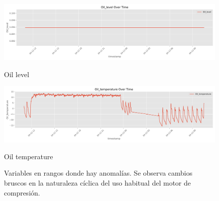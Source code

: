 \documentclass[12pt,letterpaper]{article}
\begin{document}
\begin{figure}[htp]
    \begin{minipage}[b]{0.45\textwidth}
        \centering
        \includegraphics[width=\textwidth]{Oil_level.png}
        \caption*{Oil level}
    \end{minipage}
    \hfill
    \begin{minipage}[b]{0.45\textwidth}
        \centering
        \includegraphics[width=\textwidth]{Oil_temperature.png}
        \caption*{Oil temperature}
    \end{minipage}
    \vspace{0.5em}
\caption{Variables en rangos donde hay anomalías. Se observa cambios bruscos en la naturaleza cíclica del uso habitual del motor de compresión.}
\label{fig:anomaly_in_variables}
\end{figure}
\end{document}
